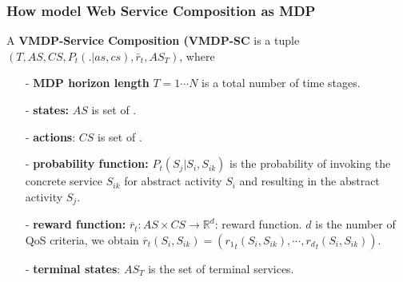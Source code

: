 \documentclass{beamer}
\newcommand{\remark}[1]{{\color{blue}{#1}}}
\begin{document}
\begin{frame}\frametitle{How model Web Service Composition as MDP}
A \textbf{VMDP-Service Composition (VMDP-SC} is a tuple $(T, AS, CS, P_t(.|as,cs), \bar{r}_t, AS_T)$, where  

\begin{itemize}
\item[ -] \textbf{MDP horizon length} $T= 1 \cdots N$ is a total number of time stages. 
\item[-] \textbf{states:} $AS$ is set of \remark{abstract services}.
\item[-] \textbf{actions}: $CS$ is set of \remark{ concrete services}.
\item[-] \textbf{probability function:} $P_t(S_j | S_i, S_{ik} )$ is the probability of invoking the concrete service $S_{ik}$ for abstract activity $S_i$ and resulting in the abstract activity $S_j$.
\item[-] \textbf{reward function:} $ \overline{r}_t: AS \times CS \longrightarrow \mathbb{R}^d$: reward function. %
$d$ is the number of QoS criteria, we obtain $\overline{r}_t(S_i, S_{ik}) = ({r_1}_t(S_i, S_{ik}), \cdots, {r_d}_t(S_i, S_{ik}))$. 
\item[-] \textbf{terminal states}: $AS_T$ is the set of terminal services. 

\end{itemize}

\end{frame}
\end{document}
